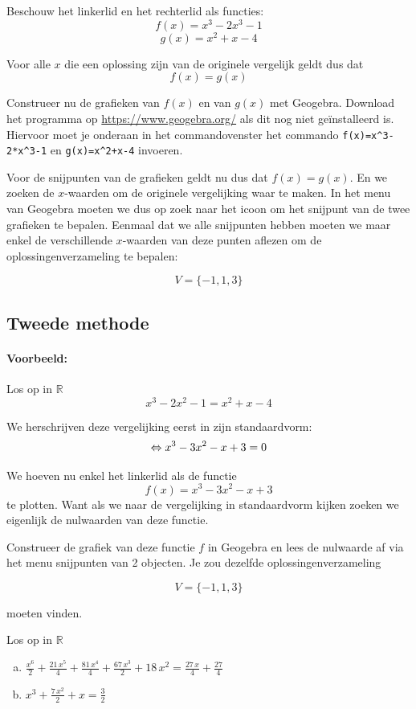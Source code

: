 \documentclass[12pt]{article}
\begin{document}
Beschouw het linkerlid en het rechterlid als functies:
$$f(x)=x^3-2x^3-1$$
$$g(x)=x^2+x-4$$

Voor alle $x$ die een oplossing zijn van de originele vergelijk geldt dus dat
$$f(x)=g(x)$$

Construeer nu de grafieken van $f(x)$ en van $g(x)$ met Geogebra. Download het programma op \url{https://www.geogebra.org/} als dit nog niet geïnstalleerd is. Hiervoor moet je onderaan in het commandovenster het commando \verb#f(x)=x^3-2*x^3-1# en \verb#g(x)=x^2+x-4# invoeren.

Voor de snijpunten van de grafieken geldt nu dus dat $f(x)=g(x)$. En we zoeken de $x$-waarden om de originele vergelijking waar te maken. In het menu van Geogebra moeten we dus op zoek naar het icoon om het snijpunt van de twee grafieken te bepalen. Eenmaal dat we alle snijpunten hebben moeten we maar enkel de verschillende $x$-waarden van deze punten aflezen om de oplossingenverzameling te bepalen:

$$V=\{-1, 1, 3\}$$

\subsection*{Tweede methode}

\paragraph*{Voorbeeld:} Los op in $\mathbb{R}$
$$x^3-2x^2-1=x^2+x-4$$

We herschrijven deze vergelijking eerst in zijn standaardvorm:
$$\Leftrightarrow x^3-3x^2-x + 3=0$$

We hoeven nu enkel het linkerlid als de functie
$$f(x)=x^3-3x^2-x + 3$$
te plotten. Want als we naar de vergelijking in standaardvorm kijken zoeken we eigenlijk de nulwaarden van deze functie.

Construeer de grafiek van deze functie $f$ in Geogebra en lees de nulwaarde af via het menu snijpunten van 2 objecten. Je zou dezelfde oplossingenverzameling

$$V=\{-1, 1, 3\}$$

moeten vinden.

\begin{oefening}
Los op in $\mathbb{R}$\\
\begin{enumerate}[(a)]
  \itemsep2em
  \item $\displaystyle\frac{{x}^{6}}{2}+\frac{21\,{x}^{5}}{4}+\frac{81\,{x}^{4}}{4}+\frac{67\,{x}^{3}}{2}+18\,{x}^{2}=\frac{27\,x}{4}+\frac{27}{4}$
  \item $\displaystyle{x}^{3}+\frac{7\,{x}^{2}}{2}+x=\frac{3}{2}$
\end{enumerate}
\end{oefening}
\end{document}
